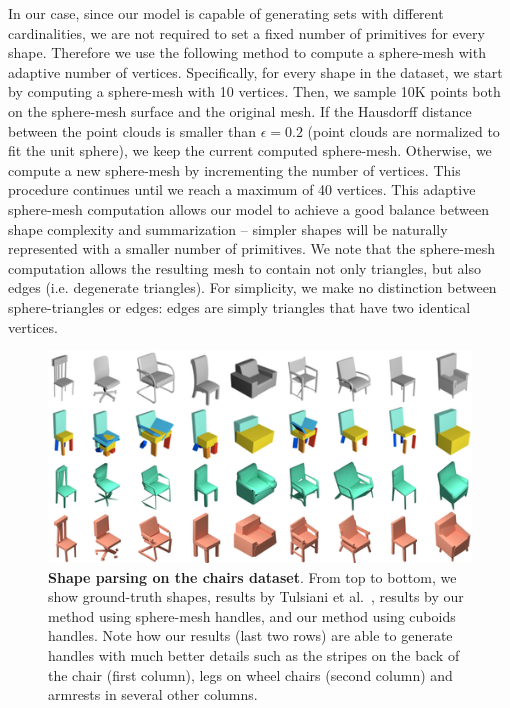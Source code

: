 In our case, since our model is capable of generating sets with different cardinalities,
we are not required to set a fixed number of primitives for every shape. Therefore we use the following method to compute a sphere-mesh with adaptive number of vertices.
Specifically, for every shape in the dataset, we start by computing a sphere-mesh with
10 vertices. 
Then, we sample 10K points both on the sphere-mesh surface and the original mesh.
If the Hausdorff distance between the point clouds is smaller than $\epsilon=0.2$
(point clouds are normalized to fit the unit sphere), we keep the current computed sphere-mesh.
Otherwise, we compute a new sphere-mesh by incrementing the number of vertices.
This procedure continues until we reach a maximum of 40 vertices.
This adaptive sphere-mesh computation allows our model to achieve
a good balance between shape complexity and summarization --
simpler shapes will be naturally represented with a smaller number of primitives.
We note that the sphere-mesh computation allows the resulting mesh to contain not only triangles, but also edges (i.e. degenerate triangles).
For simplicity, we make no distinction between sphere-triangles or edges:
edges are simply triangles that have two identical vertices.


\begin{figure}[t]
\centering
\includegraphics[width=1.0\linewidth]{handles/imgs/qualichairs.png}
\caption{\label{fig:chairs} \small
\textbf{Shape parsing on the chairs dataset}. From top to bottom, we show
ground-truth shapes,
results by Tulsiani et al.~\cite{Tulsiani2017}, results by our method using sphere-mesh handles, and our method using cuboids handles. 
Note how our results (last two rows) are able to generate handles with much better details such as the stripes on the back of the chair (first column),
legs on wheel chairs (second column) and armrests in several other columns.
}
\vspace{-10pt}
\end{figure}

